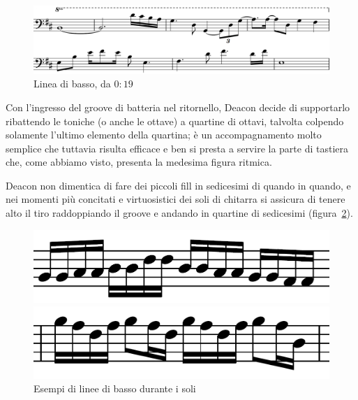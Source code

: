 \documentclass[12pt]{article}
\begin{document}
\begin{figure}[H]
 \centering
 \includegraphics[width=\textwidth,keepaspectratio]{bass/bass1}
 \caption{Linea di basso, da \(0:19\)}
 \label{fig:bass1}
\end{figure}

Con l'ingresso del groove di batteria nel ritornello, Deacon decide di supportarlo ribattendo le toniche (o anche le ottave) a quartine di ottavi, talvolta colpendo solamente l'ultimo elemento della quartina; è un accompagnamento molto semplice che tuttavia risulta efficace e ben si presta a servire la parte di tastiera che, come abbiamo visto, presenta la medesima figura ritmica.

Deacon non dimentica di fare dei piccoli fill in sedicesimi di quando in quando, e nei momenti più concitati e virtuosistici dei soli di chitarra si assicura di tenere alto il tiro raddoppiando il groove e andando in quartine di sedicesimi (figura~\ref{fig:bass2-3}).

\begin{figure}[H]
 \centering
 \begin{minipage}{0.4\textwidth}
  \centering
  \includegraphics[width=\textwidth,keepaspectratio]{bass/bass2}
 \end{minipage}
 \hfill
 \begin{minipage}{0.4\textwidth}
  \centering
  \includegraphics[width=\textwidth,keepaspectratio]{bass/bass3}
 \end{minipage}

 \caption{Esempi di linee di basso durante i soli}
 \label{fig:bass2-3}
\end{figure}
\end{document}
